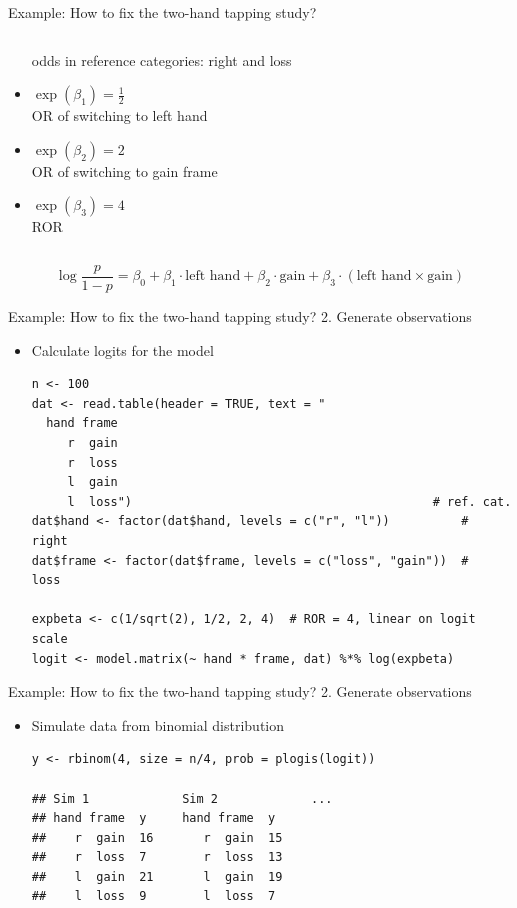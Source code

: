 \documentclass[aspectratio=169]{beamer}
\begin{document}
\begin{frame}{Example: How to fix the two-hand tapping study?}
\begin{columns}
\begin{column}{6cm}
\begin{itemize}
      odds in reference categories: right and loss
    \item $\exp(\beta_1) = \frac{1}{2}$\\
      OR of switching to left hand
    \item $\exp(\beta_2) = 2$\\
      OR of switching to gain frame
    \item $\exp(\beta_3) = 4$\\
      ROR
  \end{itemize}
\end{column}
\end{columns}
\vfill
\[
  \log \frac{p}{1 - p} = \beta_0
                  + \beta_1 \cdot \text{left hand}
                  + \beta_2 \cdot \text{gain}
                  + \beta_3 \cdot (\text{left hand} \times \text{gain})
\]

\end{frame}

\begin{frame}[fragile]{Example: How to fix the two-hand tapping study?}
  {2. Generate observations}
  \begin{itemize}
    \item Calculate logits for the model
\begin{lstlisting}
n <- 100
dat <- read.table(header = TRUE, text = "
  hand frame
     r  gain
     r  loss
     l  gain
     l  loss")                                          # ref. cat.
dat$hand <- factor(dat$hand, levels = c("r", "l"))          #   right
dat$frame <- factor(dat$frame, levels = c("loss", "gain"))  #   loss

expbeta <- c(1/sqrt(2), 1/2, 2, 4)  # ROR = 4, linear on logit scale
logit <- model.matrix(~ hand * frame, dat) %*% log(expbeta)
\end{lstlisting}
  \end{itemize}
\end{frame}


\begin{frame}[fragile]{Example: How to fix the two-hand tapping study?}
  {2. Generate observations}
  \begin{itemize}
    \item Simulate data from binomial distribution
\begin{lstlisting}
y <- rbinom(4, size = n/4, prob = plogis(logit))

## Sim 1             Sim 2             ...
## hand frame  y     hand frame  y
##    r  gain  16       r  gain  15
##    r  loss  7        r  loss  13
##    l  gain  21       l  gain  19
##    l  loss  9        l  loss  7

\end{lstlisting}
  \end{itemize}
\end{frame}
\end{document}
